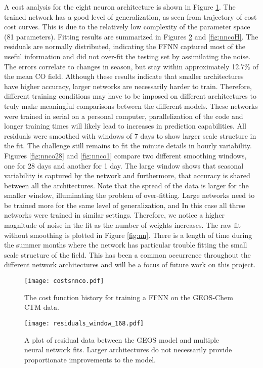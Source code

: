 A cost analysis for the eight neuron architecture is shown in Figure \ref{fig:costCF}. The trained network has a good level of generalization, as seen from trajectory of cost cost curves. This is due to the relatively low complexity of the parameter space (81 parameters). Fitting results are summarized in Figures \ref{fig:nncoR} and \ref{fig:nncoH}. The residuals are normally distributed, indicating the FFNN captured most of the useful information and did not over-fit the testing set by assimilating the noise. The errors correlate to changes in season, but stay within approximately 12.7$\%$ of the mean CO field. Although these results indicate that smaller architectures have higher accuracy, larger networks are necessarily harder to train. Therefore, different training conditions may have to be imposed on different architectures to truly make meaningful comparisons between the different models. These networks were trained in serial on a personal computer, parallelization of the code and longer training times will likely lead to increases in prediction capabilities. All residuals were smoothed with windows of 7 days to show larger scale structure in the fit. The challenge still remains to fit the minute details in hourly variability. Figures \ref{fig:nnco28} and \ref{fig:nnco1} compare two different smoothing windows, one for 28 days and another for 1 day. The large window shows that seasonal variability is captured by the network and furthermore, that accuracy is shared between all the architectures. Note that the spread of the data is larger for the smaller window, illuminating the problem of over-fitting. Large networks need to be trained more for the same level of generalization, and In this case all three networks were trained in similar settings. Therefore, we notice a higher magnitude of noise in the fit as the number of weights increases. The raw fit without smoothing is plotted in Figure \ref{fig:nn}. There is a length of time during the summer months where the network has particular trouble fitting the small scale structure of the field. This has been a common occurrence throughout the different network architectures and will be a focus of future work on this project.
\begin{figure}[!htb]
\centering
\texttt{[image: costsnnco.pdf]}
\caption{The cost function history for training a FFNN on the GEOS-Chem CTM data.}
\label{fig:costCF}
\end{figure}

\begin{figure}[!htb]
\centering
\texttt{[image: residuals\_window\_168.pdf]}
\caption{A plot of residual data between the GEOS model and multiple neural network fits. Larger architectures do not necessarily provide proportionate improvements to the model.}
\label{fig:nncoR}
\end{figure}

